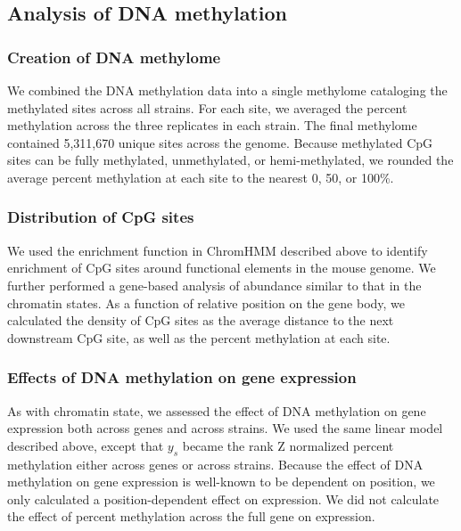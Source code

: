 \documentclass[10pt,letterpaper]{article}
\begin{document}
\hypertarget{analysis-of-dna-methylation}{%
\subsection{Analysis of DNA
methylation}\label{analysis-of-dna-methylation}}

\hypertarget{creation-of-dna-methylome}{%
\subsubsection{Creation of DNA
methylome}\label{creation-of-dna-methylome}}

We combined the DNA methylation data into a single methylome cataloging
the methylated sites across all strains. For each site, we averaged the
percent methylation across the three replicates in each strain. The
final methylome contained 5,311,670 unique sites across the genome.
Because methylated CpG sites can be fully methylated, unmethylated, or
hemi-methylated, we rounded the average percent methylation at each site
to the nearest 0, 50, or 100\%.

\hypertarget{distribution-of-cpg-sites}{%
\subsubsection{Distribution of CpG
sites}\label{distribution-of-cpg-sites}}

We used the enrichment function in ChromHMM described above to identify
enrichment of CpG sites around functional elements in the mouse genome.
We further performed a gene-based analysis of abundance similar to that
in the chromatin states. As a function of relative position on the gene
body, we calculated the density of CpG sites as the average distance to
the next downstream CpG site, as well as the percent methylation at each
site.

\hypertarget{effects-of-dna-methylation-on-gene-expression}{%
\subsubsection{Effects of DNA methylation on gene
expression}\label{effects-of-dna-methylation-on-gene-expression}}

As with chromatin state, we assessed the effect of DNA methylation on
gene expression both across genes and across strains. We used the same
linear model described above, except that \(y_{s}\) became the rank Z
normalized percent methylation either across genes or across strains.
Because the effect of DNA methylation on gene expression is well-known
to be dependent on position, we only calculated a position-dependent
effect on expression. We did not calculate the effect of percent
methylation across the full gene on expression.
\end{document}
